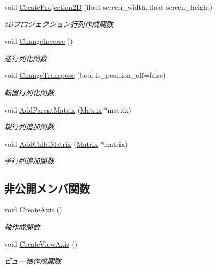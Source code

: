 \begin{DoxyCompactItemize}
void \mbox{\hyperlink{class_matrix_aac15c1a7a0fa2eac0b67e35a39668403}{Create\+Projection2D}} (float screen\+\_\+width, float screen\+\_\+height)
\begin{DoxyCompactList}\small\item\em 2\+Dプロジェクション行列作成関数 \end{DoxyCompactList}\item 
void \mbox{\hyperlink{class_matrix_a9b351172385ed7b14f21840ed654490e}{Change\+Inverse}} ()
\begin{DoxyCompactList}\small\item\em 逆行列化関数 \end{DoxyCompactList}\item 
void \mbox{\hyperlink{class_matrix_aed98c9d04ddadd3697c382dcddf3a4f0}{Change\+Transpose}} (bool is\+\_\+position\+\_\+off=false)
\begin{DoxyCompactList}\small\item\em 転置行列化関数 \end{DoxyCompactList}\item 
void \mbox{\hyperlink{class_matrix_a9bfa12d6b05ca2748def870d24356946}{Add\+Parent\+Matrix}} (\mbox{\hyperlink{class_matrix}{Matrix}} $\ast$matrix)
\begin{DoxyCompactList}\small\item\em 親行列追加関数 \end{DoxyCompactList}\item 
void \mbox{\hyperlink{class_matrix_a85469d633691b3c3d8a3cfb260dd1d48}{Add\+Child\+Matrix}} (\mbox{\hyperlink{class_matrix}{Matrix}} $\ast$matrix)
\begin{DoxyCompactList}\small\item\em 子行列追加関数 \end{DoxyCompactList}\end{DoxyCompactItemize}
\subsection*{非公開メンバ関数}
\begin{DoxyCompactItemize}
\item 
void \mbox{\hyperlink{class_matrix_a57e542a9008a8ceb9a7608debb318d04}{Create\+Axis}} ()
\begin{DoxyCompactList}\small\item\em 軸作成関数 \end{DoxyCompactList}\item 
void \mbox{\hyperlink{class_matrix_acdd474fde033edf1fd95f643888e8b22}{Create\+View\+Axis}} ()
\begin{DoxyCompactList}\small\item\em ビュー軸作成関数 \end{DoxyCompactList}\end{DoxyCompactItemize}
